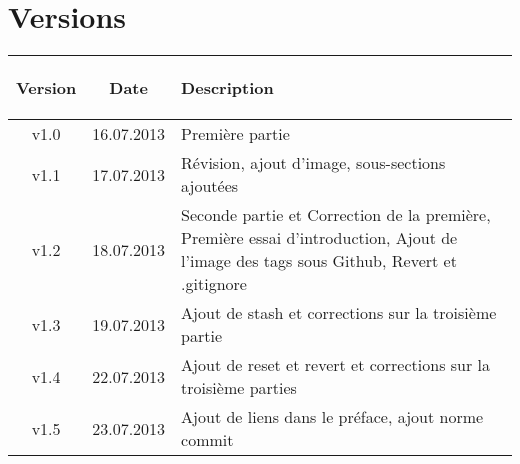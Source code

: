 \newpage
\section*{Versions}

%
%

\begin{tabular}{|c|c|C{7.5cm}|}
\hline
{}
\begin{bf}Version\end{bf} & \begin{bf}Date\end{bf} & \begin{bf}Description\end{bf} \\
\hline
v1.0 & 16.07.2013 & Première partie \\
\hline
v1.1 & 17.07.2013 & Révision, ajout d'image, sous-sections ajoutées \\
\hline
v1.2 & 18.07.2013 & Seconde partie et Correction de la première, Première essai d'introduction, Ajout de l'image des tags sous Github, Revert et .gitignore \\
\hline
v1.3 & 19.07.2013 & Ajout de stash et corrections sur la troisième partie \\
\hline
v1.4 & 22.07.2013 & Ajout de reset et revert et corrections sur la troisième parties \\
\hline
v1.5 & 23.07.2013 & Ajout de liens dans le préface, ajout norme commit \\
\hline
\end{tabular}